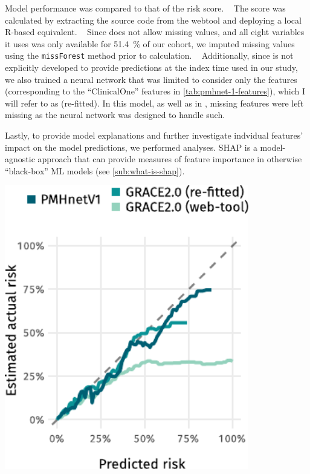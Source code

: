 Model performance was compared to that of the \graceii{} risk score.
~\autocite{foxShould2014}
The \graceii{} score was calculated by extracting the source code from the 
\graceii{} webtool and deploying a local R-based equivalent.
~\autocite{GRACE}
Since \graceii{} does not allow missing values, 
and all eight variables it uses was only available for \qty{51.4}{\percent} 
of our cohort, we imputed missing values 
using the \texttt{missForest} method prior to calculation.
~\autocite{stekhovenMissForest2012}
Additionally, since \graceii{} is not explicitly developed to provide
predictions at the index time used in our study, we also trained a 
neural network that was limited to consider only the \graceii{} features
(corresponding to the \enquote{ClinicalOne} features in 
\cref{tab:pmhnet-1-features}), which I will refer to as \graceii{} (re-fitted).
In this model, as well as in , missing features were left 
missing as the neural network was designed to handle such.

Lastly, to provide model explanations and further investigate indvidual
features' impact on the model predictions, we performed  
analyses. \ac{SHAP} is a model-agnostic approach that can provide
measures of feature importance in otherwise \enquote{black-box} \ac{ML} 
models (see \cref{sub:what-is-shap}).


\begin{marginfigure}
    \centering
    \includegraphics[trim=3mm 0 0 0, width=0.8\textwidth]{graphics/pmhnetv1-performance-curves.pdf}
    \caption[Calibration Curves for  and \acs{GRACE}]{%
        Calibration curve for the  model and
        the \acs{GRACE} 2.0 reference models at a prediction
        horizon of three years.%
    }
    \label{fig:pmhv1-curves}
\end{marginfigure}%


